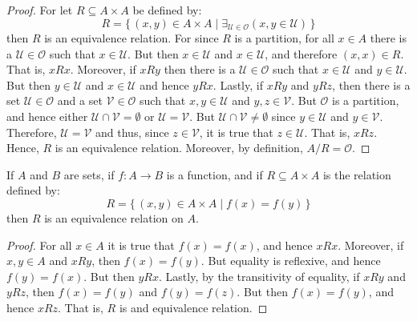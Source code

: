 \documentclass{article}                                                        %
\begin{document}
            \begin{proof}
                For let $R\subseteq{A}\times{A}$ be defined by:
                \begin{equation}
                    R=\{\,(x,y)\in{A}\times{A}\;|\;
                        \exists_{\mathcal{U}\in\mathcal{O}}
                        (x,y\in\mathcal{U})\,\}
                \end{equation}
                then $R$ is an equivalence relation. For since $R$ is a
                partition, for all $x\in{A}$ there is a
                $\mathcal{U}\in\mathcal{O}$ such that $x\in\mathcal{U}$. But
                then $x\in\mathcal{U}$ and $x\in\mathcal{U}$, and therefore
                $(x,x)\in{R}$. That is, $xRx$. Moreover, if $xRy$ then there is
                a $\mathcal{U}\in\mathcal{O}$ such that $x\in\mathcal{U}$ and
                $y\in\mathcal{U}$. But then $y\in\mathcal{U}$ and
                $x\in\mathcal{U}$ and hence $yRx$. Lastly, if $xRy$ and $yRz$,
                then there is a set $\mathcal{U}\in\mathcal{O}$ and a set
                $\mathcal{V}\in\mathcal{O}$ such that $x,y\in\mathcal{U}$ and
                $y,z\in\mathcal{V}$. But $\mathcal{O}$ is a partition, and hence
                either $\mathcal{U}\cap\mathcal{V}=\emptyset$ or
                $\mathcal{U}=\mathcal{V}$. But
                $\mathcal{U}\cap\mathcal{V}\ne\emptyset$ since $y\in\mathcal{U}$
                and $y\in\mathcal{V}$. Therefore, $\mathcal{U}=\mathcal{V}$ and
                thus, since $z\in\mathcal{V}$, it is true that
                $z\in\mathcal{U}$. That is, $xRz$. Hence, $R$ is an equivalence
                relation. Moreover, by definition, $A/R=\mathcal{O}$.
            \end{proof}
            \begin{theorem}
                \label{thm:Fibers_of_Func_Form_Equiv_Relation}%
                If $A$ and $B$ are sets, if $f:A\rightarrow{B}$ is a function,
                and if $R\subseteq{A}\times{A}$ is the relation defined by:
                \begin{equation}
                    R=\{\,(x,y)\in{A}\times{A}\;|\;f(x)=f(y)\,\}
                \end{equation}
                then $R$ is an equivalence relation on $A$.
            \end{theorem}
            \begin{proof}
                For all $x\in{A}$ it is true that $f(x)=f(x)$, and hence $xRx$.
                Moreover, if $x,y\in{A}$ and $xRy$, then $f(x)=f(y)$. But
                equality is reflexive, and hence $f(y)=f(x)$. But then $yRx$.
                Lastly, by the transitivity of equality, if $xRy$ and $yRz$,
                then $f(x)=f(y)$ and $f(y)=f(z)$. But then $f(x)=f(y)$, and
                hence $xRz$. That is, $R$ is and equivalence relation.
            \end{proof}
\end{document}

